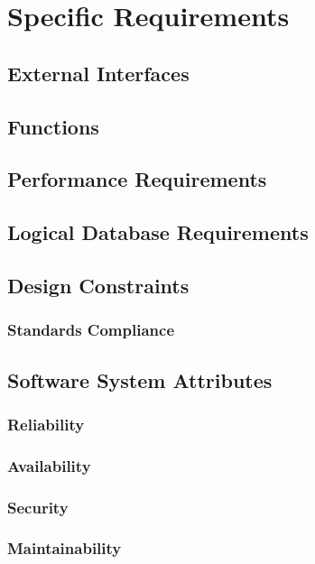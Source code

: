 \chapter{Specific Requirements} \label{chap3}

\section{External Interfaces}

\section{Functions}

\section{Performance Requirements}

\section{Logical Database Requirements}

\section{Design Constraints}

\subsection{Standards Compliance}

\section{Software System Attributes}

\subsection{Reliability}

\subsection{Availability}

\subsection{Security}

\subsection{Maintainability}

